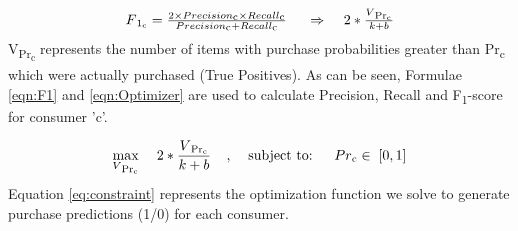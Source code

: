   \begin{equation}
    \begin{array}{l}
      F\textsubscript{1\textsubscript{c}} = \frac{2 \times Precision\textsubscript{c} 
      \times Recall\textsubscript{c}} 
      {Precision\textsubscript{c} + Recall\textsubscript{c}}
      \;
      \;\;\;\;\Rightarrow	\;\;\;\;
      2 * 
      \frac{
        V\textsubscript{Pr\textsubscript{c}}
      }
      {
        k + b
      }
    \end{array}
    \label{eqn:Optimizer}
  \end{equation}
V\textsubscript{Pr\textsubscript{c}} represents the number of items with purchase 
probabilities greater than Pr\textsubscript{c} which were actually purchased (True Positives). 
As can be seen, Formulae \ref{eqn:F1} and \ref{eqn:Optimizer} are used to calculate Precision, Recall and 
F\textsubscript{1}-score for consumer 'c'. 

  \begin{equation}
    \max_{V\textsubscript{Pr\textsubscript{c}}} \;\;\;\; 2 * \frac{ V\textsubscript{Pr\textsubscript{c}}}{k + b}
    \;\;\;\;,\;\;\;\;  \text{subject to: } \;\;\;\;  Pr\textsubscript{c}  \in \; [0,1]
    \label{eq:constraint}
  \end{equation}
Equation \ref{eq:constraint} represents the optimization function we solve to generate purchase predictions (1/0) for each consumer.
\begin{center}
\begin{table}[!t]
\caption{Model Specifications}
\centering
{}
\label{tab:modelparams}
\end{table} 
\end{center}
